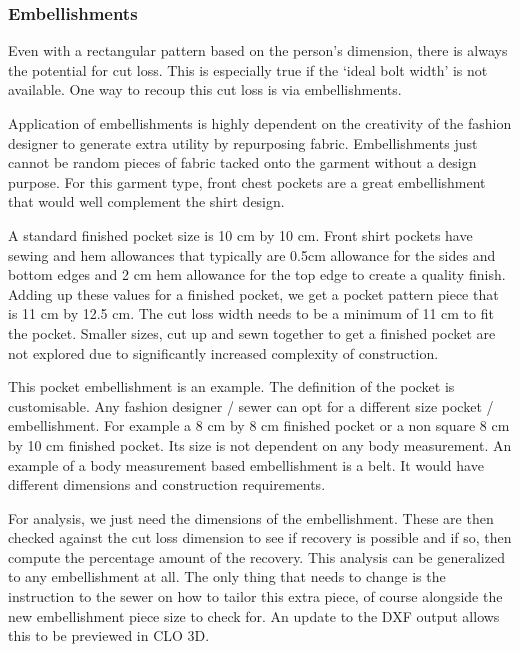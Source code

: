 
\subsubsection{Embellishments}
Even with a rectangular pattern based on the person's dimension, there is always the potential for cut loss. This is especially true if the `ideal bolt width' is not available. One way to recoup this cut loss is via embellishments.

Application of embellishments is highly dependent on the creativity of the fashion designer to generate extra utility by repurposing fabric. Embellishments just cannot be random pieces of fabric tacked onto the garment without a design purpose. For this garment type, front chest pockets are a great embellishment that would well complement the shirt design. 

A standard finished pocket size is 10 cm by 10 cm. Front shirt pockets have sewing and hem allowances that typically are 0.5cm allowance for the sides and bottom edges and 2 cm hem allowance for the top edge to create a quality finish. Adding up these values for a finished pocket, we get a pocket pattern piece that is 11 cm by 12.5 cm. The cut loss width needs to be a minimum of 11 cm to fit the pocket. Smaller sizes, cut up and sewn together to get a finished pocket are not explored due to significantly increased complexity of construction.

This pocket embellishment is an example. The definition of the pocket is customisable. Any fashion designer / sewer can opt for a different size pocket / embellishment. For example a 8 cm by 8 cm finished pocket or a non square 8 cm by 10 cm finished pocket. Its size is not dependent on any body measurement. An example of a body measurement based embellishment is a belt. It would have different dimensions and construction requirements.

For analysis, we just need the dimensions of the embellishment. These are then checked against the cut loss dimension to see if recovery is possible and if so, then compute the percentage amount of the recovery. This analysis can be generalized to any embellishment at all. The only thing that needs to change is the instruction to the sewer on how to tailor this extra piece, of course alongside the new embellishment piece size to check for. An update to the DXF output allows this to be previewed in CLO 3D.

